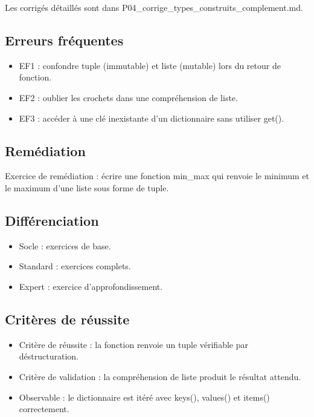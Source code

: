 Les corrigés détaillés sont dans
P04\_corrige\_types\_construits\_complement.md.

\subsection{Erreurs fréquentes}

\begin{itemize}
\tightlist
\item
  EF1 : confondre tuple (immutable) et liste (mutable) lors du retour de
  fonction.
\item
  EF2 : oublier les crochets dans une compréhension de liste.
\item
  EF3 : accéder à une clé inexistante d'un dictionnaire sans utiliser
  get().
\end{itemize}

\subsection{Remédiation}

Exercice de remédiation : écrire une fonction min\_max qui renvoie le
minimum et le maximum d'une liste sous forme de tuple.

\subsection{Différenciation}

\begin{itemize}
\tightlist
\item
  Socle : exercices de base.
\item
  Standard : exercices complets.
\item
  Expert : exercice d'approfondissement.
\end{itemize}

\subsection{Critères de réussite}

\begin{itemize}
\tightlist
\item
  Critère de réussite : la fonction renvoie un tuple vérifiable par
  déstructuration.
\item
  Critère de validation : la compréhension de liste produit le résultat
  attendu.
\item
  Observable : le dictionnaire est itéré avec keys(), values() et
  items() correctement.
\end{itemize}

